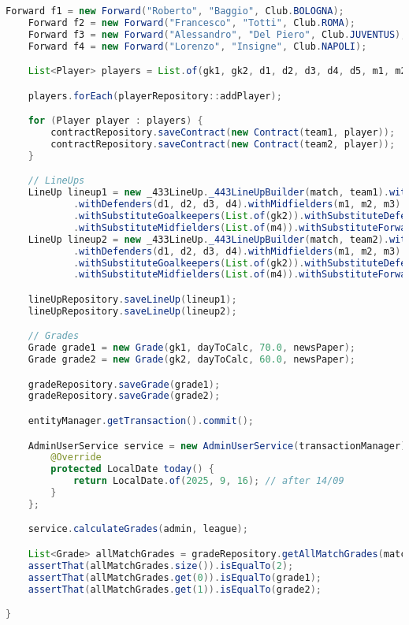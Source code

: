 \begin{lstlisting}[language=Java]
	Forward f1 = new Forward("Roberto", "Baggio", Club.BOLOGNA);
	Forward f2 = new Forward("Francesco", "Totti", Club.ROMA);
	Forward f3 = new Forward("Alessandro", "Del Piero", Club.JUVENTUS);
	Forward f4 = new Forward("Lorenzo", "Insigne", Club.NAPOLI);

	List<Player> players = List.of(gk1, gk2, d1, d2, d3, d4, d5, m1, m2, m3, m4, f1, f2, f3, f4);

	players.forEach(playerRepository::addPlayer);

	for (Player player : players) {
		contractRepository.saveContract(new Contract(team1, player));
		contractRepository.saveContract(new Contract(team2, player));
	}

	// LineUps
	LineUp lineup1 = new _433LineUp._443LineUpBuilder(match, team1).withGoalkeeper(gk1)
			.withDefenders(d1, d2, d3, d4).withMidfielders(m1, m2, m3).withForwards(f1, f2, f3)
			.withSubstituteGoalkeepers(List.of(gk2)).withSubstituteDefenders(List.of(d5))
			.withSubstituteMidfielders(List.of(m4)).withSubstituteForwards(List.of(f4)).build();
	LineUp lineup2 = new _433LineUp._443LineUpBuilder(match, team2).withGoalkeeper(gk1)
			.withDefenders(d1, d2, d3, d4).withMidfielders(m1, m2, m3).withForwards(f1, f2, f3)
			.withSubstituteGoalkeepers(List.of(gk2)).withSubstituteDefenders(List.of(d5))
			.withSubstituteMidfielders(List.of(m4)).withSubstituteForwards(List.of(f4)).build();

	lineUpRepository.saveLineUp(lineup1);
	lineUpRepository.saveLineUp(lineup2);

	// Grades
	Grade grade1 = new Grade(gk1, dayToCalc, 70.0, newsPaper);
	Grade grade2 = new Grade(gk2, dayToCalc, 60.0, newsPaper);

	gradeRepository.saveGrade(grade1);
	gradeRepository.saveGrade(grade2);

	entityManager.getTransaction().commit();

	AdminUserService service = new AdminUserService(transactionManager) {
		@Override
		protected LocalDate today() {
			return LocalDate.of(2025, 9, 16); // after 14/09
		}
	};

	service.calculateGrades(admin, league);

	List<Grade> allMatchGrades = gradeRepository.getAllMatchGrades(match, newsPaper);
	assertThat(allMatchGrades.size()).isEqualTo(2);
	assertThat(allMatchGrades.get(0)).isEqualTo(grade1);
	assertThat(allMatchGrades.get(1)).isEqualTo(grade2);

}
\end{lstlisting}


